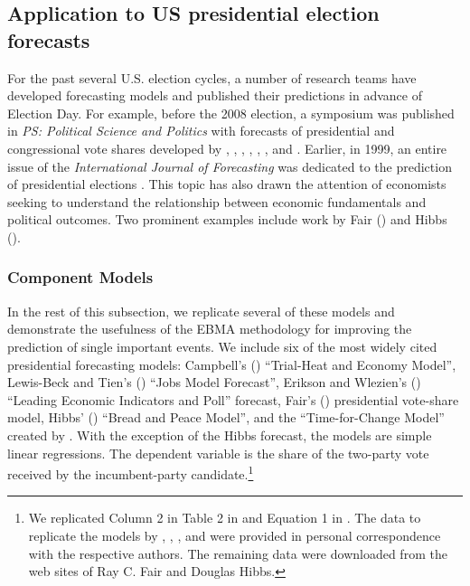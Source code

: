 \documentclass[pdftex,12pt,fullpage,oneside]{amsart}
\begin{document}
\subsection{Application to US presidential election forecasts}
For the past several U.S. election cycles, a number of research teams
have developed forecasting models and published their predictions in
advance of Election Day.  For example, before the 2008 election, a
symposium was published in \emph{PS: Political Science and Politics}
with forecasts of presidential and congressional vote shares developed
by \citet{Campbell:2008}, \citet{Norpoth:2008},
\citet{Lewis-Beck:Tien:2008}, \citet{Abramowitz:2008},
\citet{Erikson:Wlezien:2008}, \citet{Holbrook:2008},
\citet{Lockerbie:2008} and \citet{Cuzan:Bundrick:2008}. Earlier, in
1999, an entire issue of the \textit{International Journal of
  Forecasting} was dedicated to the prediction of presidential
elections \citep{Brown:1999}.  This topic has also drawn the attention
of economists seeking to understand the relationship between economic
fundamentals and political outcomes.  Two prominent examples include
work by Fair (\citeyear{Fair:2010}) and Hibbs (\citeyear{Hibbs:2000}).

\subsubsection{Component Models}

In the rest of this subsection, we replicate several of these models
and demonstrate the usefulness of the EBMA methodology for improving
the prediction of single important events.  We include six of the most
widely cited presidential forecasting models: Campbell's
(\citeyear{Campbell:2008}) ``Trial-Heat and Economy Model'',
Lewis-Beck and Tien's (\citeyear{Lewis-Beck:Tien:2008}) ``Jobs Model
Forecast'', Erikson and Wlezien's (\citeyear{Erikson:Wlezien:2008})
``Leading Economic Indicators and Poll'' forecast, Fair's
(\citeyear{Fair:2010}) presidential vote-share model, Hibbs'
(\citeyear{Hibbs:2000}) ``Bread and Peace Model'', and the
``Time-for-Change Model'' created by
\citet{Abramowitz:2008}.  \noindent With the exception of the Hibbs
forecast, the models are simple linear regressions. The dependent
variable is the share of the two-party vote received by the
incumbent-party candidate.\footnote{We replicated Column 2 in Table 2
  in \citet{Erikson:Wlezien:2008} and Equation 1 in
  \citet{Fair:2010}. The data to replicate the models by
  \citet{Abramowitz:2008}, \citet{Campbell:2008},
  \citet{Erikson:Wlezien:2008}, and \citet{Lewis-Beck:Tien:2008} were
  provided in personal correspondence with the respective authors.
  The remaining data were downloaded from the web sites of Ray C. Fair
  \nocite{Fair2011} and Douglas Hibbs\nocite{Hibbs2011}.}
\end{document}
